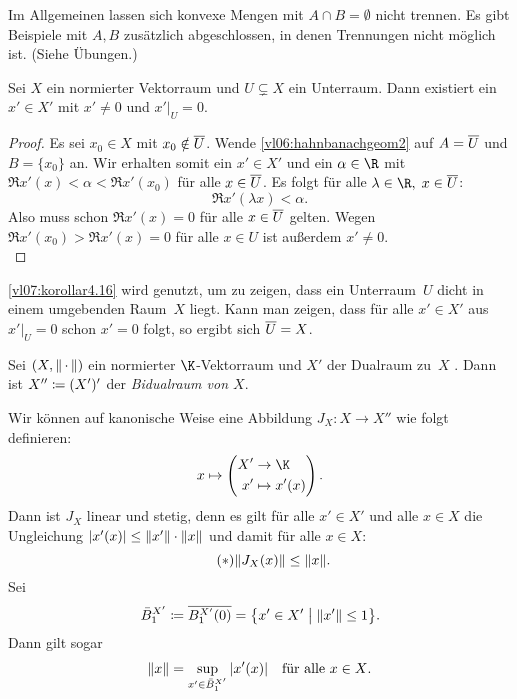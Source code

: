Im Allgemeinen lassen sich konvexe Mengen mit $A\cap B = \emptyset$ nicht
trennen. Es gibt Beispiele mit $A,B$ zusätzlich abgeschlossen, in denen
Trennungen nicht möglich ist. (Siehe Übungen.)

\begin{thKorollar} \label{vl07:korollar4.16}
    Sei $X$ ein normierter Vektorraum und $U\subsetneq X$ ein Unterraum.
    Dann existiert ein $x'\in X'$ mit $x'\neq 0$ und $x'\vert_U = 0$.
\end{thKorollar}

\begin{proof}
    Es sei $x_0\in X$ mit $x_0\notin \overline{U}$. 
    Wende \cref{vl06:hahnbanachgeom2} auf $A=\overline{U}$ und $B=\{x_0\}$ an.
    Wir erhalten somit ein $x'\in X'$ und ein $\alpha\in\R$ mit $\Re x'(x) <
    \alpha < \Re x'(x_0)$ für alle $x\in\overline{U}$. Es folgt für alle
    $\lambda\in\R,\;x\in\setclosure U$:
    \[ \Re x'(\lambda x) < \alpha  . \]
    Also muss schon $\Re x'(x) = 0$ für alle $x\in\overline{U}$ gelten. Wegen
    $\Re x'(x_0) > \Re x'(x) = 0$ für alle $x\in U$ ist außerdem $x'\neq 0$.
    \\
\end{proof}

\nnBemerkung
\cref{vl07:korollar4.16} wird genutzt, um zu zeigen, dass ein Unterraum~$U$
dicht in einem umgebenden Raum~$X$ liegt. Kann man zeigen, dass für alle
$x'\in X'$ aus $x'\vert_U = 0$ schon $x'=0$ folgt, so ergibt sich
$\overline{U} = X$.

\begin{thDef} \label{vl07:def:JX}
    Sei $(X,\lVert\,\cdot\,\rVert)$ ein normierter $\K$-Vektorraum und $X'$ der Dualraum zu~$X$
    .
    Dann ist $X'' \coloneqq (X')'$ der \emph{Bidualraum von $X$}.
\end{thDef}
    
Wir können auf kanonische Weise eine Abbildung 
$J_X\colon X\to X''$ wie folgt definieren:
\[ x\mapsto \left( 
        \begin{aligned}
            X' &\to \K  \\
            x' &\mapsto x'(x)
        \end{aligned}
    \right)
. \]
Dann ist $J_X$ linear und stetig, denn es gilt für alle $x'\in X'$ und
alle $x\in X$ die Ungleichung
$\lvert x'(x)\rvert \leq \lVert x'\rVert\cdot \lVert x\rVert$ und damit für alle $x\in X$:
\[ \tag{$\ast$} \label{vl07:ast}
    \lVert J_X(x) \rVert \leq \lVert x\rVert  . \]
Sei 
\[ \bar B^{X'}_1 \coloneqq \overline{B^{X'}_1(0)} 
    = \bigl\{ x'\in X' \;\big\vert\; \lVert x'\rVert\leq1 \bigr\} 
. \]
Dann gilt sogar 
\[ \lVert x\rVert = \sup_{x'\in \bar B^{X'}_1} \,\lvert x'(x)\rvert  
    \quad \text{für alle $x\in X$}
. \]

